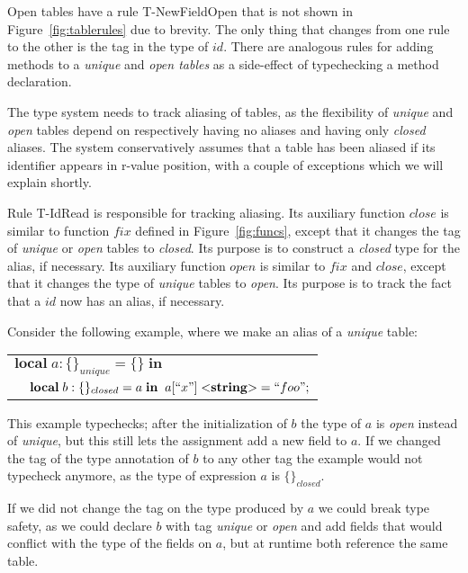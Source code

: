 \documentclass[10pt]{sigplanconf}
\newcommand{\String}{\mathbf{string}}
\begin{document}
Open tables have a rule {\sc T-NewFieldOpen} that is not shown
in Figure~\ref{fig:tablerules} due to brevity. The only thing that
changes from one rule to the other is the tag in the type of $id$.
There are analogous rules for adding methods to a {\em unique}
and {\em open tables} as a side-effect of typechecking a method declaration.

The type system needs to track aliasing of tables,
as the flexibility of {\em unique} and {\em open} tables
depend on respectively having no aliases and having only {\em closed} aliases. The system conservatively assumes that
a table has been aliased if its identifier appears in r-value position, with a couple of exceptions which we will explain shortly.

Rule {\sc T-IdRead} is responsible for tracking
aliasing. Its auxiliary function $close$ is similar to
function $fix$ defined in Figure~\ref{fig:funcs},
except that it changes the tag of {\em unique} or
{\em open} tables to {\em closed}. Its purpose
is to construct a {\em closed} type for the alias,
if necessary. Its auxiliary function $open$ is similar
to $fix$ and $close$, except that it changes the type of
{\em unique} tables to {\em open}. Its purpose
is to track the fact that a $id$ now has an alias,
if necessary.
 
Consider the following example, where we make an alias
of a {\em unique} table:
{\small
\begin{center}
\begin{tabular}{lll}
\multicolumn{3}{l}{$\mathbf{local} \; a:\{\}_{unique} = \{\} \; \mathbf{in}$}\\
& \multicolumn{2}{l}{$\mathbf{local} \; b:\{\}_{closed} = a \; \mathbf{in}\;\;a[``x"] \; {<}\String{>} = ``foo";$}
\end{tabular}
\end{center}
}

This example typechecks; after the initialization of $b$
the type of $a$ is {\em open} instead of {\em unique}, but
this still lets the assignment add a new field to $a$.
If we changed the tag of the type annotation of $b$ to
any other tag the example would not typecheck anymore,
as the type of expression $a$ is $\{\}_{closed}$.

If we did not change the tag on the type produced by $a$
we could break type safety, as we could declare $b$ with
tag {\em unique} or {\em open} and add fields that would
conflict with the type of the fields on $a$, but at
runtime both reference the same table. 
\end{document}
